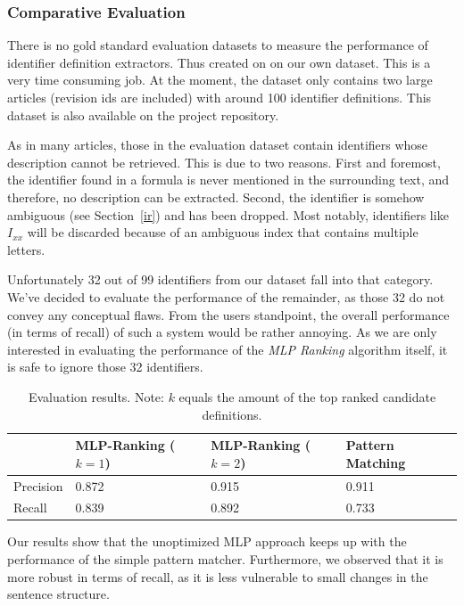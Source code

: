 \documentclass[runningheads]{llncs}
\begin{document}
\subsubsection{Comparative Evaluation}

There is no gold standard evaluation datasets to measure the
performance of identifier definition extractors. Thus created on on our own dataset.
This is a very time consuming job. At the moment, the dataset only contains two
large articles (revision ids are included) with around 100 identifier
definitions. This dataset is also available on the project repository.


As in many articles, those in the evaluation dataset contain identifiers
whose description cannot be retrieved. This is due to two reasons. First and
foremost, the identifier found in a formula is never mentioned in the
surrounding text, and therefore, no description can be extracted. Second, the
identifier is somehow ambiguous (see Section~\ref{ir}) and has been dropped. Most
notably, identifiers like $I_{xx}$ will be discarded because of an ambiguous
index that contains multiple letters.


Unfortunately 32 out of 99 identifiers from our dataset fall into that category.
We've decided to evaluate the performance of the remainder, as those 32 do not
convey any conceptual flaws. From the users standpoint, the overall performance
(in terms of recall) of such a system would be rather annoying. As we are only
interested in evaluating the performance of the \emph{MLP Ranking} algorithm itself,
it is safe to ignore those 32 identifiers.

\begin{table}[H]
\vspace{-5pt}
	\begin{center}
		\begin{tabular}{| l | l | l | l |}
			\hline
			 & MLP-Ranking ($k=1$) & MLP-Ranking ($k=2$) & Pattern Matching \\
			\hline
			Precision &  0.872  &  0.915  &  0.911  \\
			Recall    &  0.839  &  0.892  &  0.733  \\
			\hline
		\end{tabular}
	\end{center}
\caption{Evaluation results. Note: $k$ equals the amount of the top ranked candidate definitions.}
\vspace{-20pt}
\end{table}

Our results show that the unoptimized MLP approach keeps up with the
performance of the simple pattern matcher. Furthermore, we observed that it is
more robust in terms of recall, as it is less vulnerable to small changes in
the sentence structure.
\end{document}
